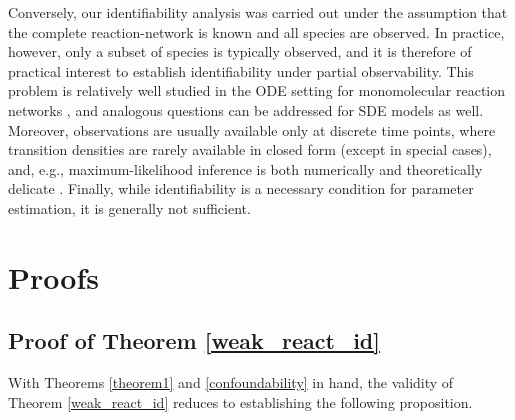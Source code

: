 \documentclass[10pt,a4paper]{amsart}
\theoremstyle{definition}
\theoremstyle{remark}
\theoremstyle{consequence}
\numberwithin{equation}{section}
\begin{document}
Conversely, our identifiability analysis was carried out under the assumption that the complete reaction-network is known and all species are observed. In practice, however, only a subset of species is typically observed, and it is therefore of practical interest to establish identifiability under partial observability. This problem is relatively well studied in the ODE setting for monomolecular reaction networks \cite{linear_RN_ODE}, and analogous questions can be addressed for SDE models as well. Moreover, observations are usually available only at discrete time points, where transition densities are rarely available in closed form (except in special cases), and, e.g., maximum-likelihood inference is both numerically and theoretically delicate \cite{SDE_inference}. Finally, while identifiability is a necessary condition for parameter estimation, it is generally not sufficient.




\section{Proofs}


\subsection{Proof of Theorem \ref{weak_react_id}} \label{prf_weak_react_id}
With Theorems \ref{theorem1} and \ref{confoundability} in hand, the validity of Theorem \ref{weak_react_id} reduces to establishing the following proposition.
\end{document}
